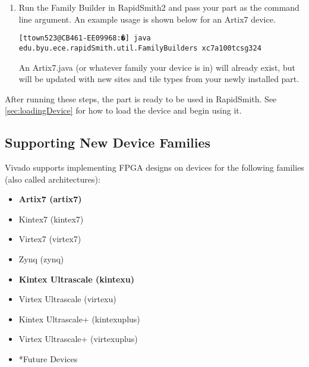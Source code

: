 \begin {enumerate}
\begin{lstlisting}[numbers=none]
[ttown523@CB461-EE09968:artix7] ls
cellLibrary.xml familyInfo.xml |\textbf{xc7a100tcsg324\_db.dat}| |\textbf{xc7a100tcsg324\_info.dat}|
\end{lstlisting} 

\noindent  The file ending in ``\_db.dat''
contains the serialized \texttt{Device} data structures for RapidSmith. The file
ending in ``\_info.dat'' contains additional serialized data (such as reverse
wire connections) that can be optionally loaded with the device.

\item Run the Family Builder in RapidSmith2 and pass your part as the command
line argument. An example usage is shown below for an Artix7 device.

\begin{lstlisting}[numbers=none]
[ttown523@CB461-EE09968:�] java edu.byu.ece.rapidSmith.util.FamilyBuilders xc7a100tcsg324
\end{lstlisting}

\noindent An Artix7.java (or whatever family your device is in) will already
exist, but will be updated with new sites and tile types from your newly
installed part.
\end{enumerate}

\noindent After running these steps, the part is ready to be used in RapidSmith.
See \autoref{sec:loadingDevice} for how to load the device and begin using it.

\subsection{Supporting New Device Families} \label{sec:newFamilies}
Vivado supports implementing FPGA designs on devices for the following families
(also called architectures):

\begin{multicols}{2}
	\begin {itemize}
	  \item \textbf{Artix7 (artix7)}
	  \item Kintex7 (kintex7)
	  \item Virtex7 (virtex7)
	  \item Zynq (zynq)
	  \item \textbf{Kintex Ultrascale (kintexu)}
	  \item Virtex Ultrascale (virtexu)
	  \item Kintex Ultrascale+ (kintexuplus)
	  \item Virtex Ultrascale+ (virtexuplus)
	  \item *Future Devices
	\end{itemize}
\end{multicols}

